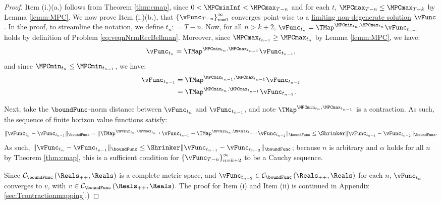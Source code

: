 \documentclass[\econtexRoot/BufferStockTheory]{subfiles}
\begin{document}
\begin{proof}

Item (i.)(a.) follows from Theorem \ref{thm:cmap}, since $0<\MPCminInf<\MPCmax_{T-n}$ and for each $t$, $\MPCmax_{T-n}\leq \MPCmax_{T-k}$ by Lemma \ref{lemm:MPC}.
We now prove Item (i.)(b.), that $\left\{\vFunc_{T-n}\right\}_{n=0}^{\infty}$ converges point-wise to a \hyperref[def:nondegeneracy]{limiting non-degenerate solution} $\vFunc$.
In the proof, to streamline the notation, we define $t_{n}\colon = T - n$.
Now, for all $n>k+2$, $\vFunc_{t_{n}} = \TMap^{\MPCmin_{t_{n}}, \MPCmax_{t_{n}}}\vFunc_{t_{n-1}}$ holds by definition of Problem \eqref{eq:veqnNrmRecBellman}.
Moreover, since $\MPCmax_{t_{n-1}}\geq \MPCmax_{t_{n}}$ by Lemma \ref{lemm:MPC}, we have:
%
\begin{equation*}
\vFunc_{t_{n}} = \TMap^{\MPCmin_{t_{n}}, \MPCmax_{t_{n-1}}}\vFunc_{t_{n-1}}, 
\end{equation*}
%
and since $\MPCmin_{t_{n}}\leq \MPCmin_{t_{n-1}}$, we have:
%
\begin{equation}\begin{gathered}\begin{aligned}
\vFunc_{t_{n-1}} &  = \TMap^{\MPCmin_{t_{n-1}}, \MPCmax_{t_{n-1}}}\vFunc_{t_{n-2}}\\ &  = \TMap^{\MPCmin_{t_{n}}, \MPCmax_{t_{n-1}}}\vFunc_{t_{n-2}}. 
\end{aligned}\end{gathered}\end{equation}

Next, take the $\boundFunc$-norm distance between $\vFunc_{t_{n}}$ and $\vFunc_{t_{n-1}}$, and note  $\TMap^{\MPCmin_{t_{n}}, \MPCmax_{t_{n-1}}}$ is a contraction.
As such, the sequence of finite horizon value functions satisfy:
%
\begin{equation*}
\Vert\vFunc_{t_{n}} - \vFunc_{t_{n-1}}\Vert_{\boundFunc} = \Vert\TMap^{\MPCmin_{t_{n}}, \MPCmax_{t_{n-1}}}\vFunc_{t_{n-1}} - \TMap^{\MPCmin_{t_{n}}, \MPCmax_{t_{n-1}}}\vFunc_{t_{n-2}}\Vert_{\boundFunc} \leq \Shrinker \Vert \vFunc_{t_{n-1}} - \vFunc_{t_{n-2}}\Vert_{\boundFunc}. 
\end{equation*}
%
As such, $\Vert \vFunc_{t_{n}} - \vFunc_{t_{n-1}}\Vert_{\boundFunc } \leq \Shrinker \Vert \vFunc_{t_{n-1}} - \vFunc_{t_{n-2}}\Vert_{\boundFunc } $; because $n$ is arbitrary and $\alpha$ holds for all $n$ by Theorem \ref{thm:cmap}, this is a sufficient condition for  $\left\{\vFunc_{T-n}\right\}_{n=k+2}^{\infty}$ to be a Cauchy sequence.

Since $\mathcal{C}_{\boundFunc }\left(\Reals_{++},\Reals\right) $ is a complete metric space, and $\vFunc_{t_{n-2}} \in \mathcal{C}_{\boundFunc }\left(\Reals_{++},\Reals\right)$ for each $n$, $\vFunc_{t_{n}}$ converges to $v$, with $v\in \mathcal{C}_{\boundFunc }\left(\Reals_{++},\Reals\right)$.
The proof for Item (i) and Item (ii) is continued in Appendix \ref{sec:Tcontractionmapping}.)
\end{proof}
\end{document}
